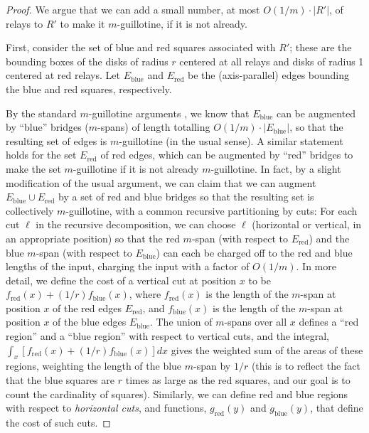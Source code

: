 \documentclass[11pt,a4paper]{article}
\newcommand{\s}[1]{{\lvert #1 \rvert}}
\newcommand{\blue}{\text{blue}}
\newcommand{\red}{\text{red}}
\theoremstyle{definition}
\theoremstyle{remark}
\begin{document}
\begin{proof}
We argue that we can add a small number, at most $O(1/m)\cdot\s{R'}$,
of relays to $R'$ to make it $m$-guillotine, if it is not already.

First, consider the set of blue and red squares associated with $R'$;
these are the bounding boxes of the disks of radius $r$ centered at
all relays and disks of radius 1 centered at red relays.  Let $E_{\blue}$
and $E_{\red}$ be the (axis-parallel) edges bounding the blue and red
squares, respectively.

By the standard $m$-guillotine arguments \cite{mitchell99guillotine},
we know that $E_{\blue}$ can be augmented by ``blue'' bridges ($m$-spans) of
length totalling $O(1/m)\cdot \s{E_{\blue}}$, so that the resulting set of
edges is $m$-guillotine (in the usual sense).  A similar statement
holds for the set $E_{\red}$ of red edges, which can be augmented by
``red'' bridges to make the set $m$-guillotine if it is not already
$m$-guillotine.  In fact, by a slight modification of the usual
argument, we can claim that we can augment $E_{\blue}\cup E_{\red}$ by a set of
red and blue bridges so that the resulting set is collectively
$m$-guillotine, with a common recursive partitioning by cuts: For each
cut $\ell$ in the recursive decomposition, we can choose $\ell$
(horizontal or vertical, in an appropriate position) so that the red
$m$-span (with respect to $E_{\red}$) and the blue $m$-span (with respect
to $E_{\blue}$) can each be charged off to the red and blue lengths of the
input, charging the input with a factor of $O(1/m)$.  In more detail,
we define the cost of a vertical cut at position $x$ to be
$f_{\red}(x)+(1/r)f_{\blue}(x)$, where $f_{\red}(x)$ is the length of the $m$-span at
position $x$ of the red edges $E_{\red}$, and $f_{\blue}(x)$ is the length of the
$m$-span at position $x$ of the blue edges $E_{\blue}$.  The union of
$m$-spans over all $x$ defines a ``red region'' and a ``blue region''
with respect to vertical cuts, and the integral, $\int_x
[f_{\red}(x)+(1/r)f_{\blue}(x)] dx$ gives the weighted sum of the areas of these
regions, weighting the length of the blue $m$-span by $1/r$ (this is
to reflect the fact that the blue squares are $r$ times as large as
the red squares, and our goal is to count the cardinality of squares).
Similarly, we can define red and blue regions with respect to {\em
  horizontal cuts}, and functions, $g_{\red}(y)$ and $g_{\blue}(y)$, that define
the cost of such cuts.


\end{proof}
\end{document}
